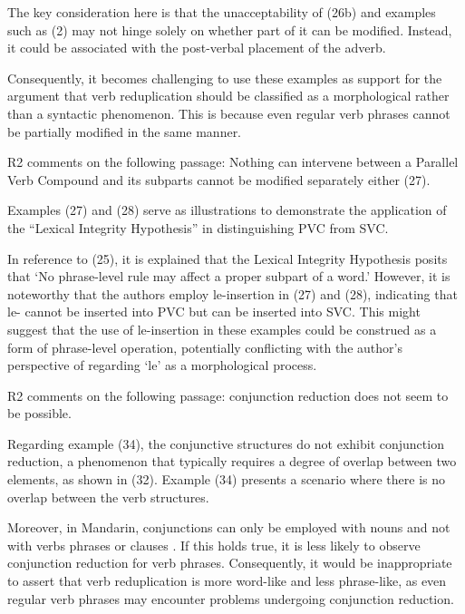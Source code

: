 \documentclass[fleqn,twoside]{article}
\begin{document}
\begin{enumerate}
\z

The key consideration here is that the unacceptability of (26b) and examples such as (2) may not hinge solely on whether part of it can be modified. Instead, it could be associated with the post-verbal placement of the adverb.

Consequently, it becomes challenging to use these examples as support for the argument that verb reduplication should be classified as a morphological rather than a syntactic phenomenon. This is because even regular verb phrases cannot be partially modified in the same manner.


\begin{displayquote}
R2 comments on the following passage: Nothing can intervene between a Parallel Verb Compound and its subparts cannot be modified separately either (27).
\end{displayquote}

Examples (27) and (28) serve as illustrations to demonstrate the application of the ``Lexical Integrity Hypothesis'' in distinguishing PVC from SVC.

In reference to (25), it is explained that the Lexical Integrity Hypothesis posits that `No
phrase-level rule may affect a proper subpart of a word.' However, it is noteworthy that the authors
employ le-insertion in (27) and (28), indicating that le- cannot be inserted into PVC but can be
inserted into SVC. This might suggest that the use of le-insertion in these examples could be
construed as a form of phrase-level operation, potentially conflicting with the author's perspective
of regarding `le' as a morphological process.

\begin{displayquote}
R2 comments on the following passage:  conjunction reduction does not seem to be possible.
\end{displayquote}

Regarding example (34), the conjunctive structures do not exhibit conjunction reduction, a phenomenon that typically requires a degree of overlap between two elements, as shown in (32). Example (34) presents a scenario where there is no overlap between the verb structures.

Moreover, in Mandarin, conjunctions can only be employed with nouns and not with verbs phrases or
clauses \citep{Schaefer2009}. If this holds true, it is less likely to observe conjunction reduction for
verb phrases. Consequently, it would be inappropriate to assert that verb reduplication is more
word-like and less phrase-like, as even regular verb phrases may encounter problems undergoing
conjunction reduction.


\end{enumerate}
\end{document}
